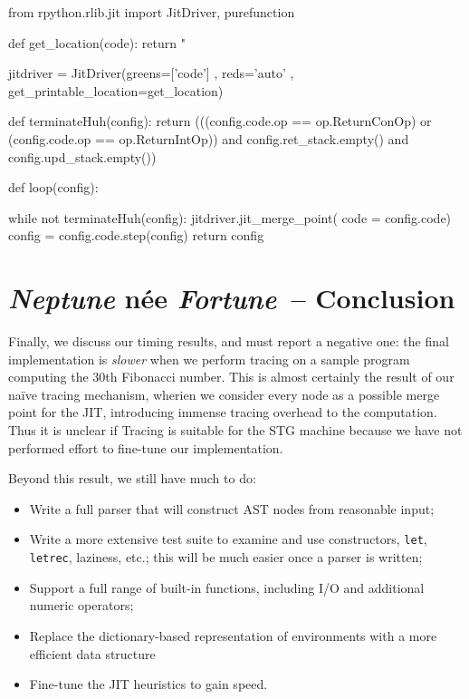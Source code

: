 \documentclass[preprint]{sigplanconf}
\begin{document}
\begin{code}
from rpython.rlib.jit import JitDriver, purefunction

def get_location(code):
    return "%

jitdriver = JitDriver(greens=['code']
                     , reds='auto'
                     , get_printable_location=get_location)

def terminateHuh(config):
  return (((config.code.op == op.ReturnConOp) or 
           (config.code.op == op.ReturnIntOp)) 
          and config.ret_stack.empty()
          and config.upd_stack.empty())

def loop(config):

  while not terminateHuh(config):
    jitdriver.jit_merge_point( code       = config.code)
    config = config.code.step(config)
  return config
\end{code}

\section{\emph{Neptune} n\'{e}e \emph{Fortune}~-- Conclusion} %

Finally, we discuss our timing results, and must report a negative one:
the final implementation is \emph{slower} when we perform tracing on
a sample program computing the 30th Fibonacci number. This is almost certainly
the result of our na\"{i}ve tracing mechanism, wherien we consider every node as
a possible merge point for the JIT, introducing immense tracing overhead to the
computation. Thus it is unclear if Tracing is suitable for the STG machine
because we have not performed effort to fine-tune our implementation.

Beyond this result, we still have much to do:
\begin{itemize}
\item Write a full parser that will construct AST nodes from reasonable input;
\item Write a more extensive test suite to examine and use constructors,
      \lstinline{let}, \lstinline{letrec}, laziness, etc.; this will be much
      easier once a parser is written;
\item Support a full range of built-in functions, including I/O and additional
      numeric operators;
\item Replace the dictionary-based representation of environments with a
      more efficient data structure
\item Fine-tune the JIT heuristics to gain speed.
\end{itemize}
\end{document}

